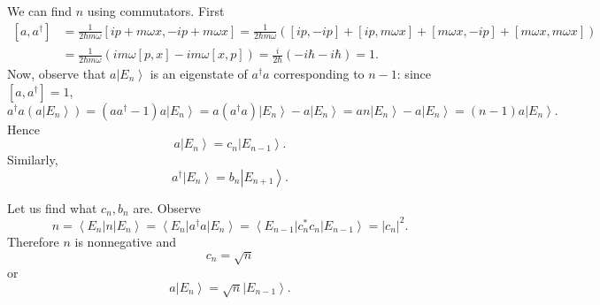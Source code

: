 \documentclass[phys334]{subfiles}
\begin{document}
    \np We can find $n$ using commutators. First
    \begin{equation*}
        \begin{aligned}
            \left[ a,a^{\dagger} \right] & = \frac{1}{2\hbar m\omega} \left[ ip+m\omega x, -ip+m\omega x \right] = \frac{1}{2\hbar m\omega} \left( \left[ ip,-ip \right] + \left[ ip,m\omega x \right] + \left[ m\omega x,-ip \right] + \left[ m\omega x, m\omega x \right]\right) \\
                                         & = \frac{1}{2\hbar m\omega} \left( im\omega\left[ p,x \right] -im\omega \left[ x,p \right] \right) = \frac{i}{2\hbar} \left( -i\hbar-i\hbar \right) = 1.
        \end{aligned} 
    \end{equation*}
Now, observe that $a\left| E_n \right\rangle$ is an eigenstate of $a^{\dagger}a$ corresponding to $n-1$: since $\left[ a,a^{\dagger} \right]=1$,
    \begin{equation*}
        a^{\dagger}a\left( a\left| E_n \right\rangle \right) = \left( aa^{\dagger}-1 \right)a\left| E_n \right\rangle = a\left( a^{\dagger}a \right)\left| E_n \right\rangle - a\left| E_n \right\rangle = an\left| E_n \right\rangle - a\left| E_n \right\rangle = \left( n-1 \right)a\left| E_n \right\rangle.
    \end{equation*}
    Hence
    \begin{equation*}
        a\left| E_n \right\rangle = c_n\left| E_{n-1} \right\rangle.
    \end{equation*}
    Similarly,
    \begin{equation*}
        a^{\dagger}\left| E_n \right\rangle = b_n\left| E_{n+1} \right\rangle.
    \end{equation*}
    
    Let us find what $c_n,b_n$ are. Observe
    \begin{equation*}
        n = \left\langle E_n \right|n\left| E_n \right\rangle = \left\langle E_n \right|a^{\dagger}a\left| E_n \right\rangle = \left\langle E_{n-1} \right| c_n^{*}c_n \left| E_{n-1} \right\rangle = \left| c_n \right|^{2}.
    \end{equation*}
    Therefore $n$ is nonnegative and
    \begin{equation*}
        c_n = \sqrt{n}
    \end{equation*}
    or
    \begin{equation*}
        a\left| E_n \right\rangle = \sqrt{n}\left| E_{n-1} \right\rangle.
    \end{equation*}
\end{document}
